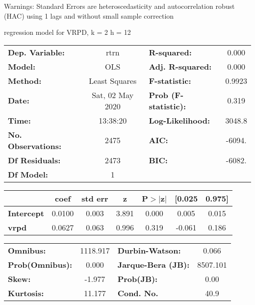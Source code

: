 Warnings: \newline
 [1] Standard Errors are heteroscedasticity and autocorrelation robust (HAC) using 1 lags and without small sample correction\ 

regression model for VRPD, k = 2 h = 12\begin{center}
\begin{tabular}{lclc}
\toprule
\textbf{Dep. Variable:}    &       rtrn       & \textbf{  R-squared:         } &     0.000   \\
\textbf{Model:}            &       OLS        & \textbf{  Adj. R-squared:    } &     0.000   \\
\textbf{Method:}           &  Least Squares   & \textbf{  F-statistic:       } &    0.9923   \\
\textbf{Date:}             & Sat, 02 May 2020 & \textbf{  Prob (F-statistic):} &    0.319    \\
\textbf{Time:}             &     13:38:20     & \textbf{  Log-Likelihood:    } &    3048.8   \\
\textbf{No. Observations:} &        2475      & \textbf{  AIC:               } &    -6094.   \\
\textbf{Df Residuals:}     &        2473      & \textbf{  BIC:               } &    -6082.   \\
\textbf{Df Model:}         &           1      & \textbf{                     } &             \\
\bottomrule
\end{tabular}
\begin{tabular}{lcccccc}
                   & \textbf{coef} & \textbf{std err} & \textbf{z} & \textbf{P$> |$z$|$} & \textbf{[0.025} & \textbf{0.975]}  \\
\midrule
\textbf{Intercept} &       0.0100  &        0.003     &     3.891  &         0.000        &        0.005    &        0.015     \\
\textbf{vrpd}      &       0.0627  &        0.063     &     0.996  &         0.319        &       -0.061    &        0.186     \\
\bottomrule
\end{tabular}
\begin{tabular}{lclc}
\textbf{Omnibus:}       & 1118.917 & \textbf{  Durbin-Watson:     } &    0.066  \\
\textbf{Prob(Omnibus):} &   0.000  & \textbf{  Jarque-Bera (JB):  } & 8507.101  \\
\textbf{Skew:}          &  -1.977  & \textbf{  Prob(JB):          } &     0.00  \\
\textbf{Kurtosis:}      &  11.177  & \textbf{  Cond. No.          } &     40.9  \\
\bottomrule
\end{tabular}
\end{center}

